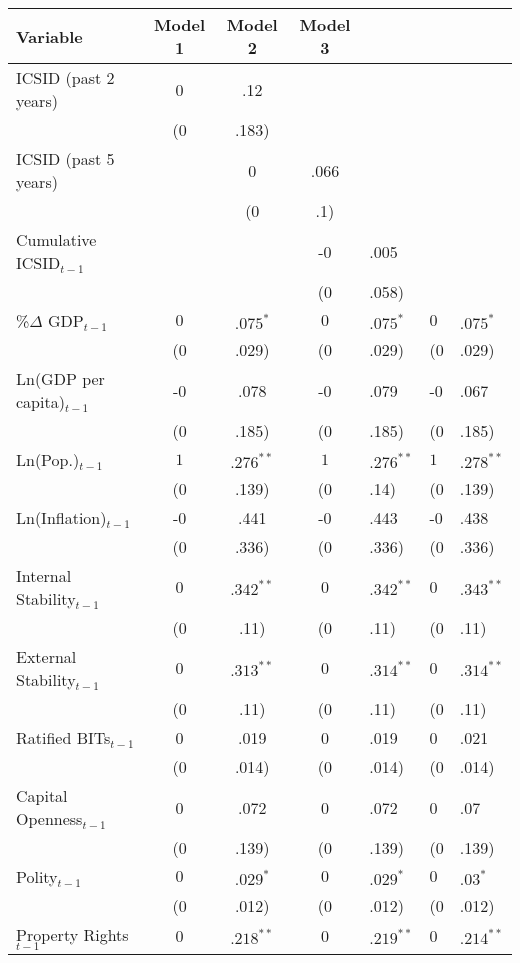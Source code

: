 \begin{table}[ht]
\centering
\begingroup\footnotesize
\begin{tabular}{lccc}
 Variable & Model 1 & Model 2 & Model 3 \\ 
  \hline
\hline
ICSID  (past 2 years) & 0&.12 &  &  \\ 
   & (0&.183) &  &  \\ 
  ICSID  (past 5 years) &  & 0&.066 &  \\ 
   &  & (0&.1) &  \\ 
  Cumulative ICSID$_{t-1}$ &  &  & -0&.005 \\ 
   &  &  & (0&.058) \\ 
  \%$\Delta$ GDP$_{t-1}$ & $0$&$.075^{\ast}$ & $0$&$.075^{\ast}$ & $0$&$.075^{\ast}$ \\ 
   & (0&.029) & (0&.029) & (0&.029) \\ 
  Ln(GDP per capita)$_{t-1}$ & -0&.078 & -0&.079 & -0&.067 \\ 
   & (0&.185) & (0&.185) & (0&.185) \\ 
  Ln(Pop.)$_{t-1}$ & $1$&$.276^{\ast\ast}$ & $1$&$.276^{\ast\ast}$ & $1$&$.278^{\ast\ast}$ \\ 
   & (0&.139) & (0&.14) & (0&.139) \\ 
  Ln(Inflation)$_{t-1}$ & -0&.441 & -0&.443 & -0&.438 \\ 
   & (0&.336) & (0&.336) & (0&.336) \\ 
  Internal Stability$_{t-1}$ & $0$&$.342^{\ast\ast}$ & $0$&$.342^{\ast\ast}$ & $0$&$.343^{\ast\ast}$ \\ 
   & (0&.11) & (0&.11) & (0&.11) \\ 
  External Stability$_{t-1}$ & $0$&$.313^{\ast\ast}$ & $0$&$.314^{\ast\ast}$ & $0$&$.314^{\ast\ast}$ \\ 
   & (0&.11) & (0&.11) & (0&.11) \\ 
  Ratified BITs$_{t-1}$ & 0&.019 & 0&.019 & 0&.021 \\ 
   & (0&.014) & (0&.014) & (0&.014) \\ 
  Capital Openness$_{t-1}$ & 0&.072 & 0&.072 & 0&.07 \\ 
   & (0&.139) & (0&.139) & (0&.139) \\ 
  Polity$_{t-1}$ & $0$&$.029^{\ast}$ & $0$&$.029^{\ast}$ & $0$&$.03^{\ast}$ \\ 
   & (0&.012) & (0&.012) & (0&.012) \\ 
  Property Rights$_{t-1}$ & $0$&$.218^{\ast\ast}$ & $0$&$.219^{\ast\ast}$ & $0$&$.214^{\ast\ast}$ \\ 

\end{tabular}
\end{table}
